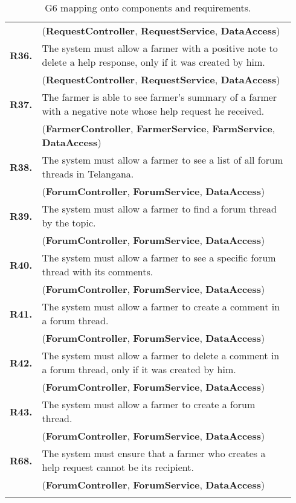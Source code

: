 \begin{longtable}{p{0.06\linewidth} p{0.88\linewidth}}
	& (\textbf{RequestController}, \textbf{RequestService}, \textbf{DataAccess})\\
	\textbf{R36.} & The system must allow a farmer with a positive note to delete a help response, only if it was created by him.\\
	& (\textbf{RequestController}, \textbf{RequestService}, \textbf{DataAccess})\\
	\textbf{R37.} & The farmer is able to see farmer's summary of a farmer with a negative note whose help request he received. \\
	& (\textbf{FarmerController}, \textbf{FarmerService}, \textbf{FarmService}, \textbf{DataAccess})\\
	\textbf{R38.} & The system must allow a farmer to see a list of all forum threads in Telangana.\\
	& (\textbf{ForumController}, \textbf{ForumService}, \textbf{DataAccess})\\
	\textbf{R39.} & The system must allow a farmer to find a forum thread by the topic.\\
	& (\textbf{ForumController}, \textbf{ForumService}, \textbf{DataAccess})\\
	\textbf{R40.} & The system must allow a farmer to see a specific forum thread with its comments.\\
	& (\textbf{ForumController}, \textbf{ForumService}, \textbf{DataAccess})\\
	\textbf{R41.} & The system must allow a farmer to create a comment in a forum thread.\\
	& (\textbf{ForumController}, \textbf{ForumService}, \textbf{DataAccess})\\
	\textbf{R42.} & The system must allow a farmer to delete a comment in a forum thread, only if it was created by him.\\
	& (\textbf{ForumController}, \textbf{ForumService}, \textbf{DataAccess})\\
	\textbf{R43.} & The system must allow a farmer to create a forum thread.\\
	& (\textbf{ForumController}, \textbf{ForumService}, \textbf{DataAccess})\\
	\textbf{R68.} & The system must ensure that a farmer who creates a help request cannot be its recipient.\\
	& (\textbf{ForumController}, \textbf{ForumService}, \textbf{DataAccess})\\
	
    \bottomrule
    \caption{G6 mapping onto components and requirements.}
\end{longtable}






